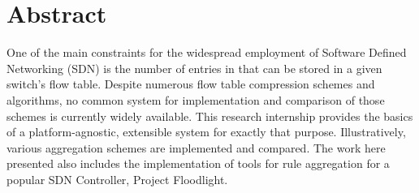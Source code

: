 \thispagestyle{plain}

\section*{Abstract}
One of the main constraints for the widespread employment of Software Defined Networking (SDN) is the number of entries in that can be stored in a given switch's flow table. Despite numerous flow table compression schemes and algorithms, no common system for implementation and comparison of those schemes is currently widely available. This research internship provides the basics of a platform-agnostic, extensible system for exactly that purpose. Illustratively, various aggregation schemes are implemented and compared. The work here presented also includes the implementation of tools for rule aggregation for a popular SDN Controller, Project Floodlight.
